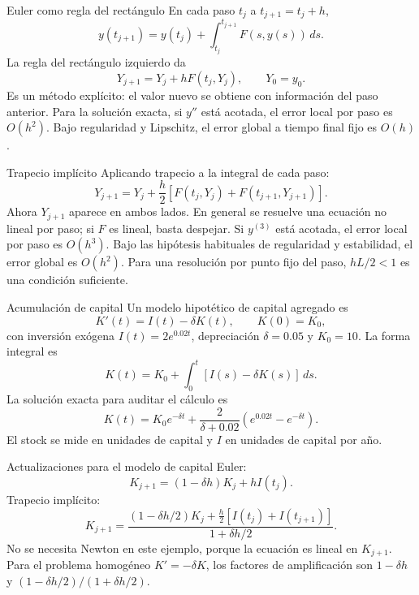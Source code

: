 \documentclass[aspectratio=169,12pt]{beamer}
\begin{document}
\begin{frame}{Euler como regla del rectángulo}
En cada paso $t_j$ a $t_{j+1}=t_j+h$,
\[y(t_{j+1})=y(t_j)+\int_{t_j}^{t_{j+1}}F(s,y(s))\,ds.\]
La regla del rectángulo izquierdo da
\[\boxed{Y_{j+1}=Y_j+hF(t_j,Y_j),\qquad Y_0=y_0.}\]
Es un método explícito: el valor nuevo se obtiene con información del paso anterior.
Para la solución exacta, si $y''$ está acotada, el error local por paso es $O(h^2)$.
Bajo regularidad y Lipschitz, el error global a tiempo final fijo es $O(h)$.
\end{frame}

\begin{frame}{Trapecio implícito}
Aplicando trapecio a la integral de cada paso:
\[\boxed{Y_{j+1}=Y_j+\frac h2
[F(t_j,Y_j)+F(t_{j+1},Y_{j+1})].}\]
Ahora $Y_{j+1}$ aparece en ambos lados. En general se resuelve una ecuación
no lineal por paso; si $F$ es lineal, basta despejar.
Si $y^{(3)}$ está acotada, el error local por paso es $O(h^3)$.
Bajo las hipótesis habituales de regularidad y estabilidad, el error global es $O(h^2)$.
Para una resolución por punto fijo del paso, $hL/2<1$ es una condición suficiente.
\end{frame}

\begin{frame}{Acumulación de capital}
Un modelo hipotético de capital agregado es
\[K'(t)=I(t)-\delta K(t),\qquad K(0)=K_0,\]
con inversión exógena $I(t)=2e^{0.02t}$, depreciación $\delta=0.05$ y $K_0=10$.
La forma integral es
\[K(t)=K_0+\int_0^t[I(s)-\delta K(s)]\,ds.\]
La solución exacta para auditar el cálculo es
\[K(t)=K_0e^{-\delta t}
+\frac2{\delta+0.02}(e^{0.02t}-e^{-\delta t}).\]
El stock se mide en unidades de capital y $I$ en unidades de capital por año.
\end{frame}

\begin{frame}{Actualizaciones para el modelo de capital}
Euler:
\[K_{j+1}=(1-\delta h)K_j+hI(t_j).\]
Trapecio implícito:
\[\boxed{K_{j+1}=\frac{(1-\delta h/2)K_j+
\frac h2[I(t_j)+I(t_{j+1})]}{1+\delta h/2}.}\]
No se necesita Newton en este ejemplo, porque la ecuación es lineal en $K_{j+1}$.
Para el problema homogéneo $K'=-\delta K$, los factores de amplificación son
$1-\delta h$ y $(1-\delta h/2)/(1+\delta h/2)$.
\end{frame}
\end{document}
